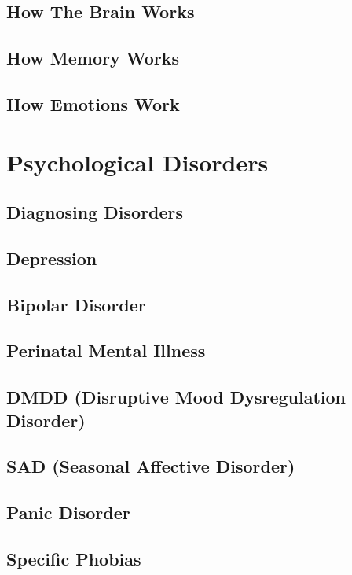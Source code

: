 \documentclass[oneside]{book}
\numberwithin{equation}{section}
\begin{document}
\subsection{How The Brain Works}

\subsection{How Memory Works}

\subsection{How Emotions Work}

\section{Psychological Disorders}

\subsection{Diagnosing Disorders}

\subsection{Depression}

\subsection{Bipolar Disorder}

\subsection{Perinatal Mental Illness}

\subsection{DMDD (Disruptive Mood Dysregulation Disorder)}

\subsection{SAD (Seasonal Affective Disorder)}

\subsection{Panic Disorder}

\subsection{Specific Phobias}
\end{document}

